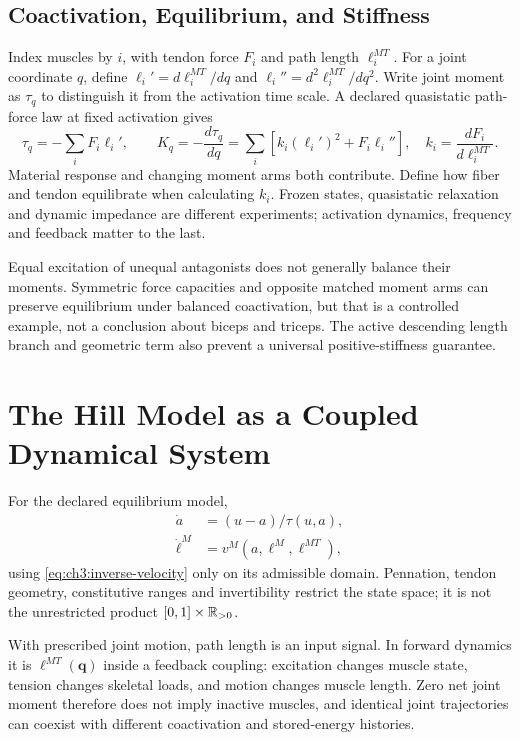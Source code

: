 \subsection{Coactivation, Equilibrium, and Stiffness}

Index muscles by $i$, with tendon force $F_i$ and path length $\ell_i^{MT}$.
For a joint coordinate $q$, define $\ell_i'=d\ell_i^{MT}/dq$ and
$\ell_i''=d^2\ell_i^{MT}/dq^2$. Write joint moment as $\tau_q$
to distinguish it from the activation time scale.
A declared quasistatic path-force law at fixed activation gives
\[
 \tau_q=-\sum_i F_i\ell_i',\qquad
 K_q=-\frac{d\tau_q}{dq}
 =\sum_i\left[k_i(\ell_i')^2+F_i\ell_i''\right],
 \quad k_i=\frac{dF_i}{d\ell_i^{MT}}.
\]
Material response and changing moment arms both contribute.
Define how fiber and tendon equilibrate when calculating $k_i$.
Frozen states, quasistatic relaxation and dynamic impedance are different
experiments; activation dynamics, frequency and feedback matter to the last.

Equal excitation of unequal antagonists does not generally balance their
moments. Symmetric force capacities and opposite matched moment arms can
preserve equilibrium under balanced coactivation, but that is a controlled
example, not a conclusion about biceps and triceps. The active descending
length branch and geometric term also prevent a universal positive-stiffness
guarantee.

\section{The Hill Model as a Coupled Dynamical System}

For the declared equilibrium model,
\begin{align}
 \dot a&=(u-a)/\tau(u,a),\label{eq:ch3:state-activation}\\
 \dot\ell^M&=v^M(a,\ell^M,\ell^{MT}),\label{eq:ch3:state-fiber}
\end{align}
using \eqref{eq:ch3:inverse-velocity} only on its admissible domain.
Pennation, tendon geometry, constitutive ranges and invertibility restrict
the state space; it is not the unrestricted product $[0,1]\times\mathbb{R}_{>0}$.

With prescribed joint motion, path length is an input signal. In forward
dynamics it is $\ell^{MT}(\bm q)$ inside a feedback coupling: excitation
changes muscle state, tension changes skeletal loads, and motion changes
muscle length. Zero net joint moment therefore does not imply inactive
muscles, and identical joint trajectories can coexist with different
coactivation and stored-energy histories.

